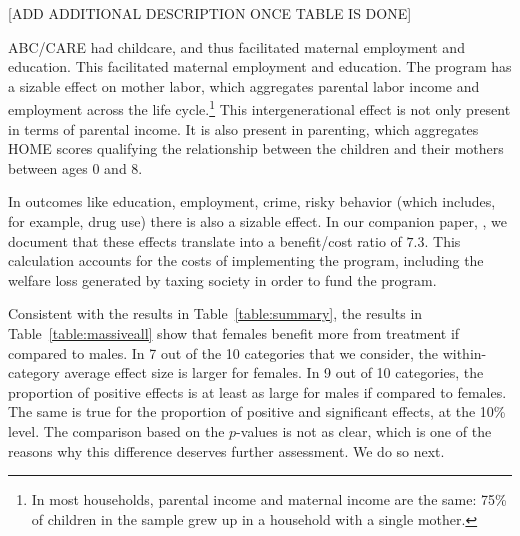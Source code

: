 [ADD ADDITIONAL DESCRIPTION ONCE TABLE IS DONE]

ABC/CARE had childcare, and thus facilitated maternal employment and education. This facilitated maternal employment and education. The program has a sizable effect on mother labor, which aggregates parental labor income and employment across the life cycle.\footnote{In most households, parental income and maternal income are the same: 75\% of children in the sample grew up in a household with a single mother.} This intergenerational effect is not only present in terms of parental income. It is also present in parenting, which aggregates HOME scores qualifying the relationship between the children and their mothers between ages 0 and 8.

In outcomes like education, employment, crime, risky behavior (which includes, for example, drug use) there is also a sizable effect. In our companion paper, \citet{Garcia_Heckman_Leaf_etal_2017_Comp_CBA_Unpublished}, we document that these effects translate into a benefit/cost ratio of $7.3$. This calculation accounts for the costs of implementing the program, including the welfare loss generated by taxing society in order to fund the program.

Consistent with the results in Table~\ref{table:summary}, the results in Table~\ref{table:massiveall} show that females benefit more from treatment if compared to males. In 7 out of the 10 categories that we consider, the within-category average effect size is larger for females. In 9 out of 10 categories, the proportion of positive effects is at least as large for males if compared to females. The same is true for the proportion of positive and significant effects, at the 10\% level. The comparison based on the \citet{Rosenbaum_2005_Distribution_JRSS} $p$-values is not as clear, which is one of the reasons why this difference deserves further assessment. We do so next.


